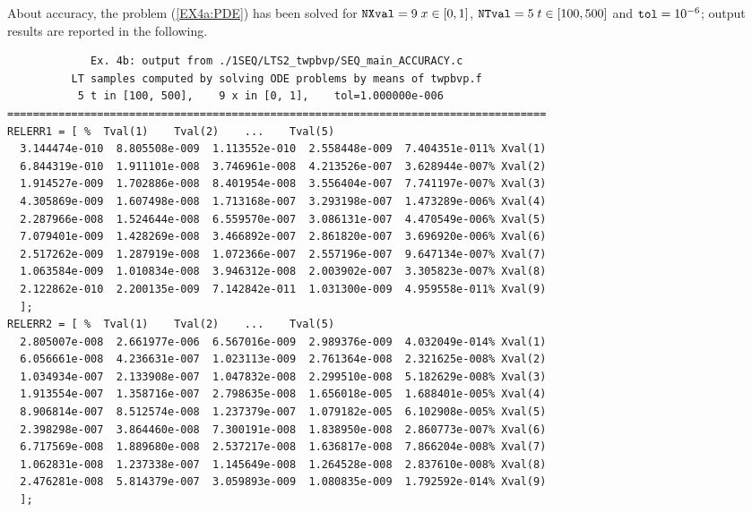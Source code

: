 \documentclass[a4paper,10pt]{report}%
\begin{document}
About accuracy, the problem (\ref{EX4a:PDE}) has been solved for ${\tt NXval}=9\; x\in[0,1]$,
${\tt NTval}=5\; t\in[100,500]$ and ${\tt tol}=10^{-6}$; output results are reported in the following.
\newpage
\begin{lstlisting}
             Ex. 4b: output from ./1SEQ/LTS2_twpbvp/SEQ_main_ACCURACY.c
          LT samples computed by solving ODE problems by means of twpbvp.f
           5 t in [100, 500],    9 x in [0, 1],    tol=1.000000e-006
====================================================================================
RELERR1 = [ %  Tval(1)    Tval(2)    ...    Tval(5)
  3.144474e-010  8.805508e-009  1.113552e-010  2.558448e-009  7.404351e-011% Xval(1)
  6.844319e-010  1.911101e-008  3.746961e-008  4.213526e-007  3.628944e-007% Xval(2)
  1.914527e-009  1.702886e-008  8.401954e-008  3.556404e-007  7.741197e-007% Xval(3)
  4.305869e-009  1.607498e-008  1.713168e-007  3.293198e-007  1.473289e-006% Xval(4)
  2.287966e-008  1.524644e-008  6.559570e-007  3.086131e-007  4.470549e-006% Xval(5)
  7.079401e-009  1.428269e-008  3.466892e-007  2.861820e-007  3.696920e-006% Xval(6)
  2.517262e-009  1.287919e-008  1.072366e-007  2.557196e-007  9.647134e-007% Xval(7)
  1.063584e-009  1.010834e-008  3.946312e-008  2.003902e-007  3.305823e-007% Xval(8)
  2.122862e-010  2.200135e-009  7.142842e-011  1.031300e-009  4.959558e-011% Xval(9)
  ];
RELERR2 = [ %  Tval(1)    Tval(2)    ...    Tval(5)
  2.805007e-008  2.661977e-006  6.567016e-009  2.989376e-009  4.032049e-014% Xval(1)
  6.056661e-008  4.236631e-007  1.023113e-009  2.761364e-008  2.321625e-008% Xval(2)
  1.034934e-007  2.133908e-007  1.047832e-008  2.299510e-008  5.182629e-008% Xval(3)
  1.913554e-007  1.358716e-007  2.798635e-008  1.656018e-005  1.688401e-005% Xval(4)
  8.906814e-007  8.512574e-008  1.237379e-007  1.079182e-005  6.102908e-005% Xval(5)
  2.398298e-007  3.864460e-008  7.300191e-008  1.838950e-008  2.860773e-007% Xval(6)
  6.717569e-008  1.889680e-008  2.537217e-008  1.636817e-008  7.866204e-008% Xval(7)
  1.062831e-008  1.237338e-007  1.145649e-008  1.264528e-008  2.837610e-008% Xval(8)
  2.476281e-008  5.814379e-007  3.059893e-009  1.080835e-009  1.792592e-014% Xval(9)
  ];
\end{lstlisting}
\end{document}

